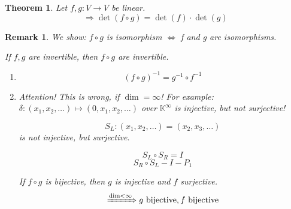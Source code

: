 \documentclass[a4paper,landscape,twocolumn]{article}
\newtheorem{theorem}{Theorem}
\newtheorem{rem}{Remark}
\begin{document}
\begin{theorem}
  \label{theorem-7.29}
  Let $f,g: V \to V$ be linear.
  \[ \Rightarrow \det(f \circ g) = \det(f) \cdot \det(g) \]
\end{theorem}
\begin{rem}
  We show: $f \circ g$ is isomorphism $\Leftrightarrow$ f and g are isomorphisms.

  If $f,g$ are invertible, then $f \circ g$ are invertible.
  \begin{enumerate}
    \item
      \[ (f \circ g)^{-1} = g^{-1} \circ f^{-1} \]
    \item
      Attention! This is wrong, if $\dim = \infty$!
      For example: $\delta: (x_1, x_2, \ldots) \mapsto (0, x_1, x_2, \ldots)$ over $\mathbb K^\infty$
      is injective, but not surjective!

      \[ S_L: (x_1, x_2, \ldots) = (x_2, x_3, \ldots) \]
      is not injective, but surjective.

      \[ S_L \circ S_R = I \]
      \[ S_R \circ S_L - I - P_1 \]

      If $f \circ g$ is bijective, then $g$ is injective and $f$ surjective.
      \[ \xRightarrow{\dim < \infty} g \text{ bijective}, f \text{ bijective} \]
  \end{enumerate}
\end{rem}
\end{document}
